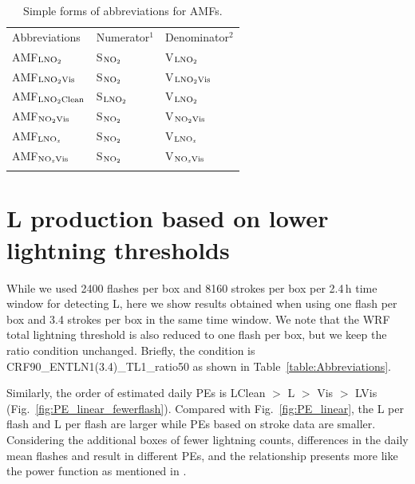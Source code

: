 \documentclass[amt]{copernicus}
\begin{document}
\begin{table}[h!]
    \caption{Simple forms of abbreviations for AMFs.}
    \begin{tabular}{lll}
        \tophline
        {Abbreviations} & {Numerator$^1$} & {Denominator$^2$} \\
        \middlehline
        AMF$_\chem{LNO_2}$          & S$_\chem{NO_2}$     & V$_\chem{LNO_2}$ \\
        AMF$_{\chem{LNO_2}\mathrm{Vis}}$       & S$_\chem{NO_2}$     & V$_{\chem{LNO_2}\mathrm{Vis}}$ \\
        AMF$_{\chem{LNO_2}\mathrm{Clean}}$     & S$_\chem{LNO_2}$    & V$_\chem{LNO_2}$ \\
        AMF$_{\chem{NO_2}\mathrm{Vis}}$        & S$_\chem{NO_2}$     & V$_{\chem{NO_2}\mathrm{Vis}}$ \\
        AMF$_\chem{LNO_\mathit{x}}$          & S$_\chem{NO_2}$     & V$_\chem{LNO_\mathit{x}}$ \\
        AMF$_{\chem{NO_\mathit{x}}\mathrm{Vis}}$        & S$_\chem{NO_2}$     & V$_{\chem{NO_\mathit{x}}\mathrm{Vis}}$ \\
        \bottomhline
    \end{tabular}
    \label{table:AMFs}
\end{table}

\section{L production based on lower lightning thresholds} \label{AppendixB}
While we used 2400 flashes per box and 8160 strokes per box per 2.4\,h time window for detecting L, here we show results obtained when using one flash per box and 3.4 strokes per box in the same time window.
We note that the WRF total lightning threshold is also reduced to one flash per box, but we keep the ratio condition unchanged.
Briefly, the condition is CRF90\_ENTLN1(3.4)\_TL1\_ratio50 as shown in Table~\ref{table:Abbreviations}.

Similarly, the order of estimated daily PEs is LClean $>$ L $>$ Vis $>$ LVis (Fig.~\ref{fig:PE_linear_fewerflash}).
Compared with Fig.~\ref{fig:PE_linear}, the L per flash and L per flash are larger while PEs based on stroke data are smaller.
Considering the additional boxes of fewer lightning counts, differences in the daily mean flashes and  result in different PEs, and the relationship presents more like the power function as mentioned in \citet{Bucsela.2019}.
\end{document}
